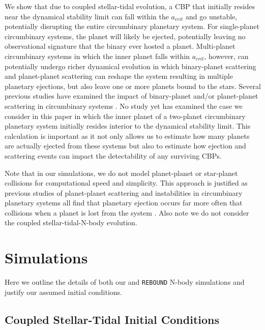 We show that due to coupled stellar-tidal evolution, a CBP that initially resides near the dynamical stability limit can fall within the $a_{crit}$ and go unstable, potentially disrupting the entire circumbinary planetary system.  For single-planet circumbinary systems, the planet will likely be ejected, potentially leaving no observational signature that the binary ever hosted a planet.  Multi-planet circumbinary systems in which the inner planet falls within $a_{crit}$, however, can potentially undergo richer dynamical evolution in which binary-planet scattering and planet-planet scattering can reshape the system resulting in multiple planetary ejections, but also leave one or more planets bound to the stars.  Several previous studies have examined the impact of binary-planet and/or planet-planet scattering in circumbinary systems \citep[e.g.][]{Kratter2014,Smullen2016,Sutherland2016,Gong2017,Gong2017b}.  No study yet has examined the case we consider in this paper in which the inner planet of a two-planet circumbinary planetary system initially resides interior to the dynamical stability limit.  This calculation is important as it not only allows us to estimate how many planets are actually ejected from these systems but also to estimate how ejection and scattering events can impact the detectability of any surviving CBPs.

Note that in our simulations, we do not model planet-planet or star-planet collisions for computational speed and simplicity.  This approach is justified as previous studies of planet-planet scattering and instabilities in circumbinary planetary systems all find that planetary ejection occurs far more often that collisions when a planet is lost from the system \citep[see][]{Smullen2016,Sutherland2016}.  Also note we do not consider the coupled stellar-tidal-N-body evolution.


\section{Simulations} \label{STEEP:sec:simulations}

Here we outline the details of both our \vplanet and \texttt{REBOUND} N-body simulations and justify our assumed initial conditions.

\subsection{Coupled Stellar-Tidal Initial Conditions} \label{STEEP:sec:initial_conditions}


